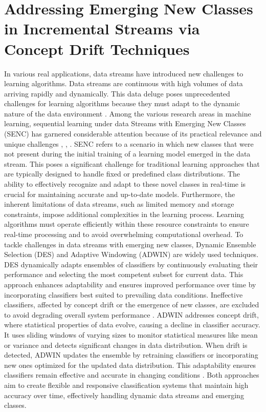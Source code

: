 
\chapter{Addressing Emerging New Classes in Incremental Streams via Concept Drift Techniques}
  \label{chapter:5_emerging}
  
  In various real applications, data streams have introduced new challenges to learning algorithms. Data streams are continuous with high volumes of data arriving rapidly and dynamically. This data deluge poses unprecedented challenges for learning algorithms because they must adapt to the dynamic nature of the data environment \cite{yang2021concept, dong2019multistream, shan2018online}. Among the various research areas in machine learning, sequential learning under data Streams with Emerging New Classes (SENC) has garnered considerable attention because of its practical relevance and unique challenges \cite{da2014learning}, \cite{mu2017streaming}, \cite{zhu2020semi}. SENC refers to a scenario in which new classes that were not present during the initial training of a learning model emerged in the data stream. This poses a significant challenge for traditional learning approaches that are typically designed to handle fixed or predefined class distributions. The ability to effectively recognize and adapt to these novel classes in real-time is crucial for maintaining accurate and up-to-date models. Furthermore, the inherent limitations of data streams, such as limited memory and storage constraints, impose additional complexities in the learning process. Learning algorithms must operate efficiently within these resource constraints to ensure real-time processing and to avoid overwhelming computational overhead.
  To tackle challenges in data streams with emerging new classes, Dynamic Ensemble Selection (DES) and Adaptive Windowing (ADWIN) are widely used techniques. DES dynamically adapts ensembles of classifiers by continuously evaluating their performance and selecting the most competent subset for current data. This approach enhances adaptability and ensures improved performance over time by incorporating classifiers best suited to prevailing data conditions. Ineffective classifiers, affected by concept drift or the emergence of new classes, are excluded to avoid degrading overall system performance \cite{cruz2017meta, jackowski2014improved, kuncheva2000clustering}.  
  ADWIN addresses concept drift, where statistical properties of data evolve, causing a decline in classifier accuracy. It uses sliding windows of varying sizes to monitor statistical measures like mean or variance and detects significant changes in data distribution. When drift is detected, ADWIN updates the ensemble by retraining classifiers or incorporating new ones optimized for the updated data distribution. This adaptability ensures classifiers remain effective and accurate in changing conditions \cite{gama2004learning, adams2023explainable, madkour2023historical}. Both approaches aim to create flexible and responsive classification systems that maintain high accuracy over time, effectively handling dynamic data streams and emerging classes.

